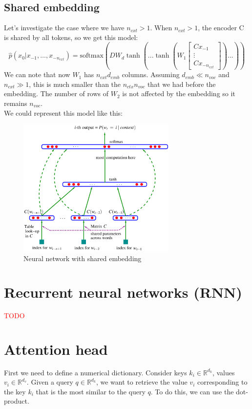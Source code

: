 \documentclass[12pt, openany]{report}
\newcommand{\R}{\mathbb{R}}
\theoremstyle{definition}
\begin{document}
\subsection{Shared embedding}
Let's investigate the case where we have $n_{cxt} > 1$. When $n_{cxt} > 1$, the encoder C is shared by all tokens, so we get this model:
\begin{equation}
  \hat{p}(x_0 | x_{-1}, \ldots, x_{-n_{cxt}}) = \text{softmax}(D W_d \tanh(... \tanh(W_1 \begin{bmatrix} C x_{-1} \\ \vdots \\ C x_{-n_{cxt}} \end{bmatrix}) ... ))
\end{equation}
We can note that now $W_1$ has $n_{cxt}d_{emb}$ columns. Assuming $d_{emb} \ll n_{voc}$ and $n_{cxt} \gg 1$, this is much smaller than the $n_{ctx}n_{voc}$ that we had before the embedding. The number of rows of $W_2$ is not affected by the embedding so it remains $n_{voc}$.\\
We could represent this model like this:\\
\begin{figure}[H]
    \centering
    \includegraphics[width=0.7\textwidth]{img/shared_embedding.png}
    \caption{Neural network with shared embedding}
    \label{fig:shared_embedding}
\end{figure}
\section{Recurrent neural networks (RNN)}
\textcolor{red}{TODO}
\section{Attention head}
First we need to define a numerical dictionary. Consider keys $k_i \in \R^{d_k}$, values $v_i \in \R^{d_v}$. Given a query $q \in \R^{d_k}$, we want to retrieve the value $v_i$ corresponding to the key $k_i$ that is the most similar to the query $q$. To do this, we can use the dot-product.
\end{document}
